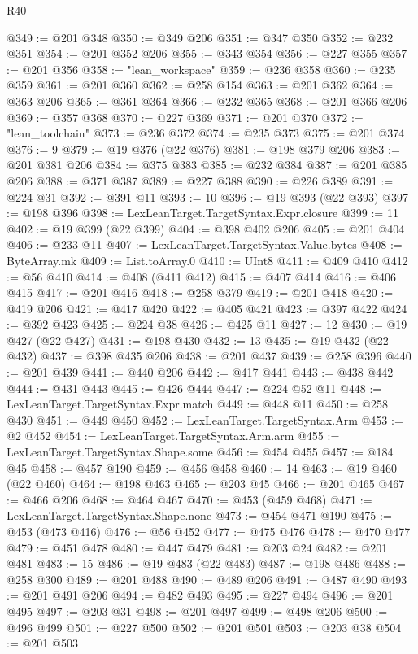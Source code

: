 \begin{lexlean}{R40}
\begin{coremodule}
@349 := @201 @348
@350 := @349 @206
@351 := @347 @350
@352 := @232 @351
@354 := @201 @352 @206
@355 := @343 @354
@356 := @227 @355
@357 := @201 @356
@358 := "lean_workspace"
@359 := @236 @358
@360 := @235 @359
@361 := @201 @360
@362 := @258 @154
@363 := @201 @362
@364 := @363 @206
@365 := @361 @364
@366 := @232 @365
@368 := @201 @366 @206
@369 := @357 @368
@370 := @227 @369
@371 := @201 @370
@372 := "lean_toolchain"
@373 := @236 @372
@374 := @235 @373
@375 := @201 @374
@376 := 9
@379 := @19 @376 (@22 @376)
@381 := @198 @379 @206
@383 := @201 @381 @206
@384 := @375 @383
@385 := @232 @384
@387 := @201 @385 @206
@388 := @371 @387
@389 := @227 @388
@390 := @226 @389
@391 := @224 @31
@392 := @391 @11
@393 := 10
@396 := @19 @393 (@22 @393)
@397 := @198 @396
@398 := LexLeanTarget.TargetSyntax.Expr.closure
@399 := 11
@402 := @19 @399 (@22 @399)
@404 := @398 @402 @206
@405 := @201 @404
@406 := @233 @11
@407 := LexLeanTarget.TargetSyntax.Value.bytes
@408 := ByteArray.mk
@409 := List.toArray.{0}
@410 := UInt8
@411 := @409 @410
@412 := @56 @410
@414 := @408 (@411 @412)
@415 := @407 @414
@416 := @406 @415
@417 := @201 @416
@418 := @258 @379
@419 := @201 @418
@420 := @419 @206
@421 := @417 @420
@422 := @405 @421
@423 := @397 @422
@424 := @392 @423
@425 := @224 @38
@426 := @425 @11
@427 := 12
@430 := @19 @427 (@22 @427)
@431 := @198 @430
@432 := 13
@435 := @19 @432 (@22 @432)
@437 := @398 @435 @206
@438 := @201 @437
@439 := @258 @396
@440 := @201 @439
@441 := @440 @206
@442 := @417 @441
@443 := @438 @442
@444 := @431 @443
@445 := @426 @444
@447 := @224 @52 @11
@448 := LexLeanTarget.TargetSyntax.Expr.match
@449 := @448 @11
@450 := @258 @430
@451 := @449 @450
@452 := LexLeanTarget.TargetSyntax.Arm
@453 := @2 @452
@454 := LexLeanTarget.TargetSyntax.Arm.arm
@455 := LexLeanTarget.TargetSyntax.Shape.some
@456 := @454 @455
@457 := @184 @45
@458 := @457 @190
@459 := @456 @458
@460 := 14
@463 := @19 @460 (@22 @460)
@464 := @198 @463
@465 := @203 @45
@466 := @201 @465
@467 := @466 @206
@468 := @464 @467
@470 := @453 (@459 @468)
@471 := LexLeanTarget.TargetSyntax.Shape.none
@473 := @454 @471 @190
@475 := @453 (@473 @416)
@476 := @56 @452
@477 := @475 @476
@478 := @470 @477
@479 := @451 @478
@480 := @447 @479
@481 := @203 @24
@482 := @201 @481
@483 := 15
@486 := @19 @483 (@22 @483)
@487 := @198 @486
@488 := @258 @300
@489 := @201 @488
@490 := @489 @206
@491 := @487 @490
@493 := @201 @491 @206
@494 := @482 @493
@495 := @227 @494
@496 := @201 @495
@497 := @203 @31
@498 := @201 @497
@499 := @498 @206
@500 := @496 @499
@501 := @227 @500
@502 := @201 @501
@503 := @203 @38
@504 := @201 @503

\end{coremodule}
\end{lexlean}

